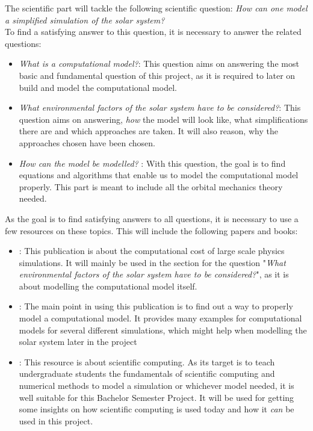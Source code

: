 \documentclass[conference,compsoc]{IEEEtran}
\begin{document}
The scientific part will tackle the following scientific question: \emph{How can one model a simplified simulation of the solar system?} \\
To find a satisfying answer to this question, it is necessary to answer the related questions:
\begin{itemize}
	\item \emph{What is a computational model?}: This question aims on answering the most basic and fundamental question of this project, as it is required to later on build and model the computational model.
	\item \emph{What environmental factors of the solar system have to be considered?}: This question aims on answering, \emph{how} the model will look like, what simplifications there are and which approaches are taken. It will also reason, why the approaches chosen have been chosen.
	\item \emph{How can the model be modelled? }: With this question, the goal is to find equations and algorithms that enable us to model the computational model properly. This part is meant to include all the orbital mechanics theory needed. 
\end{itemize}
As the goal is to find satisfying answers to all questions, it is necessary to use a few resources on these topics.
This will include the following papers and books:
\begin{itemize}
	\item \cite{PhysicsSimulationsLargeWorlds}: This publication is about the computational cost of large scale physics simulations. It will mainly be used in the section for the question "\emph{What environmental factors of the solar system have to be considered?}", as it is about modelling the computational model itself. 
	\item \cite{ComputationalModelling}: The main point in using this publication is to find out a way to properly model a computational model. It provides many examples for computational models for several different simulations, which might help when modelling the solar system later in the project
	\item \cite{ScientificComputing}: This resource is about scientific computing. As its target is to teach undergraduate students the fundamentals of scientific computing and numerical methods to model a simulation or whichever model needed, it is well suitable for this Bachelor Semester Project. It will be used for getting some insights on how scientific computing is used today and how it \emph{can} be used in this project.
\end{itemize}
\end{document}
